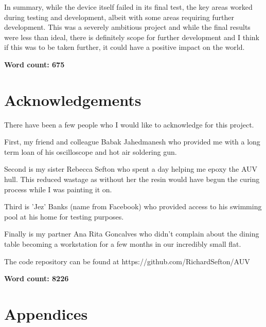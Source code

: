 \documentclass[11pt,a4paper,titlepage]{report}
\begin{document}
	In summary, while the device itself failed in its final test, the key areas worked during testing and development, albeit with some areas requiring further development. This was a severely ambitious project and while the final results were less than ideal, there is definitely scope for further development and I think if this was to be taken further, it could have a positive impact on the world. 
	
	\textbf{Word count: 675}

	\chapter*{Acknowledgements}
	
	There have been a few people who I would like to acknowledge for this project.
	
	First, my friend and colleague Babak Jahedmanesh who provided me with a long term loan of his oscilloscope and hot air soldering gun. 
	
	Second is my sister Rebecca Sefton who spent a day helping me epoxy the AUV hull. This reduced wastage as without her the resin would have begun the curing process while I was painting it on.
	
	Third is 'Jez' Banks (name from Facebook) who provided access to his swimming pool at his home for testing purposes.
	
	Finally is my partner Ana Rita Goncalves who didn't complain about the dining table becoming a workstation for a few months in our incredibly small flat.
	
	The code repository can be found at https://github.com/RichardSefton/AUV
	
	\textbf{Word count: 8226} 

	\newpage
	\printbibliography
	
	\chapter*{Appendices}
	
\end{document}
